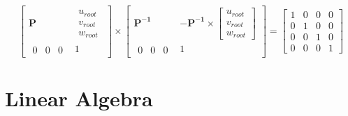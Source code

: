 \documentclass[12pt]{article}
\begin{document}
        \[
            \left[ \begin{array}{cc}
                \textbf{P} & \begin{array}{c} u_{root} \\ v_{root} \\ w_{root} \end{array} \\
                \begin{array}{ccc} 0 & 0 & 0 \end{array} & 1
            \end{array} \right]
            \times
            \left[ \begin{array}{cc}
                \bm{P^{-1}} &
                -\bm{P^{-1}} \times
                \left[ \begin{array}{c}
                    u_{root} \\ v_{root} \\ w_{root}
                \end{array} \right] \\
                \begin{array}{ccc} 0 & 0 & 0 \end{array} &
                1
            \end{array} \right]
            =
            \left[ \begin{array}{cccc}
                1 & 0 & 0 & 0 \\
                0 & 1 & 0 & 0 \\
                0 & 0 & 1 & 0 \\
                0 & 0 & 0 & 1
            \end{array} \right]
        \]
\section{Linear Algebra}
\end{document}
